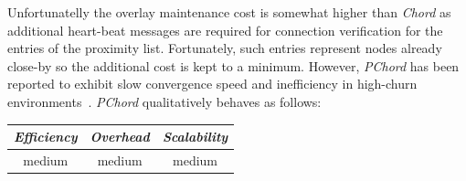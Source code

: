 Unfortunatelly the overlay maintenance cost is somewhat higher than
\emph{Chord} as additional heart-beat messages are required for
connection verification for the entries of the proximity list. 
Fortunately, such entries represent nodes 
already close-by so the additional cost is kept to a minimum.
However, \emph{PChord} has been reported to exhibit slow convergence speed 
and inefficiency in high-churn environments~\cite{DK2006}.
\emph{PChord} qualitatively behaves as follows:
\begin{center}
{\footnotesize
\begin{tabular}{ccc}
\emph{Efficiency} & \emph{Overhead} & \emph{Scalability} \\
\hline
medium &
medium &
medium
\end{tabular}
}
\end{center}

